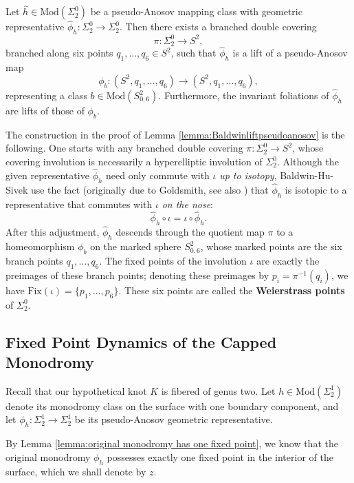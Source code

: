 \begin{lemma}\label{lemma:Baldwinliftpseudoanosov}
    Let $\hat{h} \in \mathrm{Mod}(\Sigma_2^0)$ be a pseudo-Anosov mapping class with geometric representative $\hat{\phi}_h \colon \Sigma_2^0 \to \Sigma_2^0$. Then there exists a branched double covering
    \[
    \pi \colon \Sigma_2^0 \to S^2,
    \]
    branched along six points $q_1, \dots, q_6 \in S^2$, such that $\hat{\phi}_h$ is a lift of a pseudo-Anosov map
    \[
    \phi_b \colon (S^2, q_1, \dots, q_6) \to (S^2, q_1, \dots, q_6),
    \]
    representing a class $b \in \mathrm{Mod}(S^2_{0,6})$. Furthermore, the invariant foliations of $\hat{\phi}_h$ are lifts of those of $\phi_b$.
\end{lemma}

The construction in the proof of Lemma \ref{lemma:Baldwinliftpseudoanosov} is the following. One starts with any branched double covering $\pi \colon \Sigma_2^0 \to S^2$, whose covering involution is necessarily a hyperelliptic involution of $\Sigma_2^0$. Although the given representative $\hat{\phi}_h$ need only commute with $\iota$ \emph{up to isotopy}, Baldwin-Hu-Sivek use the fact (originally due to Goldsmith, see also \cite[Theorem~4.1]{FarbMargalit2012}) that $\hat{\phi}_h$ is isotopic to a representative that commutes with $\iota$ \emph{on the nose}:
\[
\hat{\phi}_h \circ \iota = \iota \circ \hat{\phi}_h.
\]
After this adjustment, $\hat{\phi}_h$ descends through the quotient map $\pi$ to a homeomorphism $\phi_b$ on the marked sphere $S^2_{0,6}$, whose marked points are the six branch points $q_1, \ldots, q_6$. The fixed points of the involution $\iota$ are exactly the preimages of these branch points; denoting these preimages by $p_i = \pi^{-1}(q_i)$, we have $\mathrm{Fix}(\iota) = \{p_1, \dots , p_6\}$. These six points are called the \textbf{Weierstrass points} of $\Sigma_2^0$.

\subsection{Fixed Point Dynamics of the Capped Monodromy}

Recall that our hypothetical knot $K$ is fibered of genus two. Let $h \in \mathrm{Mod}(\Sigma_2^1)$ denote its monodromy class on the surface with one boundary component, and let $\phi_h \colon \Sigma_2^1 \to \Sigma_2^1$ be its pseudo-Anosov geometric representative.

By Lemma \ref{lemma:original monodromy has one fixed point}, we know that the original monodromy $\phi_h$ possesses exactly one fixed point in the interior of the surface, which we shall denote by $z$.

